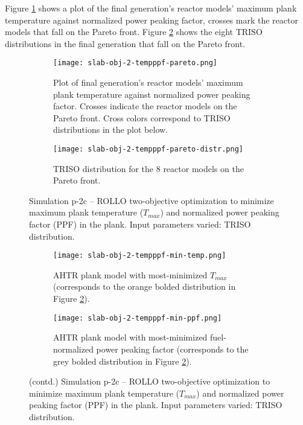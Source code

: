 Figure \ref{fig:slab-obj-2-tempppf-pareto} shows a plot of the final generation's 
reactor models' maximum plank temperature against normalized power peaking factor, 
crosses mark the reactor models that fall on the Pareto front.
Figure \ref{fig:slab-obj-2-tempppf-pareto-distr} shows the eight TRISO distributions in 
the final generation that fall on the Pareto front. 
\begin{figure}[htbp!]
    \centering
    \begin{subfigure}{\textwidth}
        \texttt{[image: slab-obj-2-tempppf-pareto.png]}
        \caption{Plot of final generation's reactor models' maximum plank temperature against normalized 
        power peaking factor. Crosses indicate the reactor models on the Pareto front. Cross colors 
        correspond to TRISO distributions in the plot below.}
        \label{fig:slab-obj-2-tempppf-pareto} 
    \end{subfigure}
    \begin{subfigure}{\textwidth}
        \texttt{[image: slab-obj-2-tempppf-pareto-distr.png]}
        \caption{TRISO distribution for the 8 reactor models on the Pareto front.}
        \label{fig:slab-obj-2-tempppf-pareto-distr} 
    \end{subfigure}
    \caption{Simulation p-2c -- ROLLO two-objective optimization to minimize maximum plank temperature 
    ($T_{max}$) and normalized power peaking factor (PPF) in the plank. 
    Input parameters varied: TRISO distribution.}
    \label{fig:slab-obj-2-tempppf}
\end{figure}
\begin{figure}[htbp!]
    \ContinuedFloat
    \begin{subfigure}{\textwidth}
        \texttt{[image: slab-obj-2-tempppf-min-temp.png]}
        \caption{\gls{AHTR} plank model with most-minimized $T_{max}$
        (corresponds to the orange bolded distribution in Figure 
        \ref{fig:slab-obj-2-tempppf-pareto-distr}).}
        \label{fig:slab-obj-2-tempppf-min-temp} 
    \end{subfigure}
    \begin{subfigure}{\textwidth}
        \texttt{[image: slab-obj-2-tempppf-min-ppf.png]}
        \caption{\gls{AHTR} plank model with most-minimized fuel-normalized power peaking 
        factor (corresponds to the grey bolded distribution in Figure 
        \ref{fig:slab-obj-2-tempppf-pareto-distr}).}
        \label{fig:slab-obj-2-tempppf-min-ppf} 
    \end{subfigure}
    \caption{(contd.) Simulation p-2c -- ROLLO two-objective optimization to minimize 
    maximum plank temperature ($T_{max}$) and normalized power peaking factor (PPF) 
    in the plank. 
    Input parameters varied: TRISO distribution.}
\end{figure}

